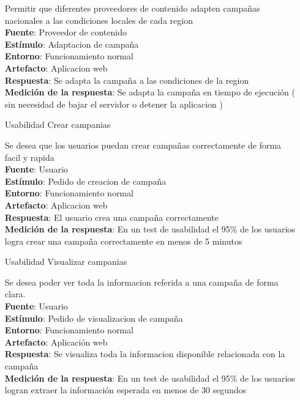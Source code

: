 \documentclass[a4paper, 11pt]{article}
\begin{document}
\begin{itemize}
Permitir que diferentes proveedores de contenido adapten campañas nacionales a las condiciones locales de cada region \\
\textbf{Fuente}:  Proveedor de contenido  \\
\textbf{Estímulo}: Adaptacion de campaña \\
\textbf{Entorno}: Funcionamiento normal \\
\textbf{Artefacto}: Aplicacion web \\
\textbf{Respuesta}: Se adapta la campaña a las condiciones de la region \\
\textbf{Medición de la respuesta}: Se adapta la campaña en tiempo de ejecución ( sin necesidad de bajar el servidor o detener la aplicacion ) \\

\item[Usabilidad] Crear campanias

Se desea que los usuarios puedan crear campañas correctamente de forma facil y rapida \\
\textbf{Fuente}:  Usuario \\
\textbf{Estímulo}: Pedido de creacion de campaña \\
\textbf{Entorno}: Funcionamiento normal \\
\textbf{Artefacto}: Aplicacion web \\
\textbf{Respuesta}: El usuario crea una campaña correctamente \\
\textbf{Medición de la respuesta}: En un test de usabilidad el 95\% de los usuarios logra crear una campaña correctamente en menos de 5 minutos \\

\item[Usabilidad] Visualizar campanias

Se desea poder ver toda la informacion referida a una campaña de forma clara. \\
\textbf{Fuente}:  Usuario \\
\textbf{Estímulo}: Pedido de visualizacion de campaña \\
\textbf{Entorno}: Funcionamiento normal \\
\textbf{Artefacto}: Aplicación web \\
\textbf{Respuesta}: Se visualiza toda la informacion disponible relacionada con la campaña \\
\textbf{Medición de la respuesta}: En un test de usabilidad el 95\% de los usuarios logran extraer la información esperada en menos de 30 segundos \\


\end{itemize}
\end{document}
